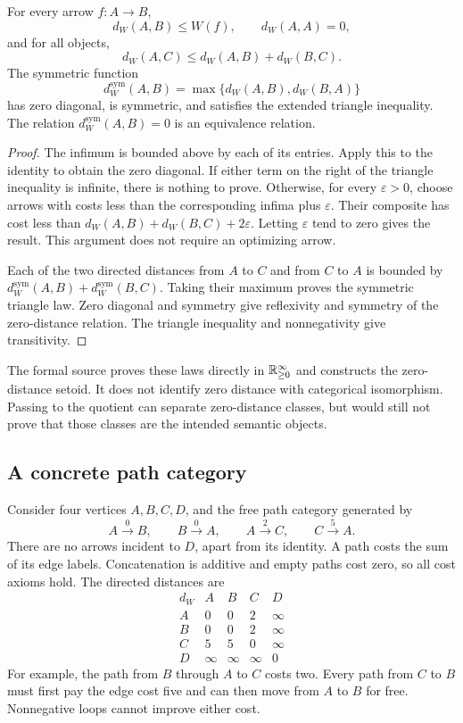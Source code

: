 \begin{proposition}\label{KS78}
For every arrow \(f:A\to B\),
\[
 d_W(A,B)\le W(f),\qquad d_W(A,A)=0,
\]
and for all objects,
\[
 d_W(A,C)\le d_W(A,B)+d_W(B,C).
\]
The symmetric function
\[
 d_W^{\mathrm{sym}}(A,B)=\max\{d_W(A,B),d_W(B,A)\}
\]
has zero diagonal, is symmetric, and satisfies the extended triangle inequality. The relation \(d_W^{\mathrm{sym}}(A,B)=0\) is an equivalence relation.
\end{proposition}
\begin{proof}
The infimum is bounded above by each of its entries. Apply this to the identity to obtain the zero diagonal. If either term on the right of the triangle inequality is infinite, there is nothing to prove. Otherwise, for every \(\varepsilon>0\), choose arrows with costs less than the corresponding infima plus \(\varepsilon\). Their composite has cost less than
\(d_W(A,B)+d_W(B,C)+2\varepsilon\). Letting \(\varepsilon\) tend to zero gives the result. This argument does not require an optimizing arrow.

Each of the two directed distances from \(A\) to \(C\) and from \(C\) to \(A\) is bounded by \(d_W^{\mathrm{sym}}(A,B)+d_W^{\mathrm{sym}}(B,C)\). Taking their maximum proves the symmetric triangle law. Zero diagonal and symmetry give reflexivity and symmetry of the zero-distance relation. The triangle inequality and nonnegativity give transitivity.
\end{proof}
The formal source proves these laws directly in \(\mathbb R_{\ge0}^{\infty}\) and constructs the zero-distance setoid. It does not identify zero distance with categorical isomorphism. Passing to the quotient can separate zero-distance classes, but would still not prove that those classes are the intended semantic objects.

\subsection{A concrete path category}
Consider four vertices \(A,B,C,D\), and the free path category generated by
\[
 A\xrightarrow{0}B,\qquad B\xrightarrow{0}A,\qquad
 A\xrightarrow{2}C,\qquad C\xrightarrow{5}A.
\]
There are no arrows incident to \(D\), apart from its identity. A path costs the sum of its edge labels. Concatenation is additive and empty paths cost zero, so all cost axioms hold. The directed distances are
\[
 \begin{array}{c|rrrr}
 d_W&A&B&C&D\\\hline
 A&0&0&2&\infty\\
 B&0&0&2&\infty\\
 C&5&5&0&\infty\\
 D&\infty&\infty&\infty&0
 \end{array}
\]
For example, the path from \(B\) through \(A\) to \(C\) costs two. Every path from \(C\) to \(B\) must first pay the edge cost five and can then move from \(A\) to \(B\) for free. Nonnegative loops cannot improve either cost.

